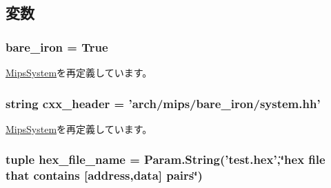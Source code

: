 \subsection{変数}
\hypertarget{classMipsSystem_1_1BareIronMipsSystem_a600ac10fe4fa7eb6168fcdf31a513b95}{
\subsubsection[{bare\_\-iron}]{\setlength{\rightskip}{0pt plus 5cm}bare\_\-iron = True}}
\label{classMipsSystem_1_1BareIronMipsSystem_a600ac10fe4fa7eb6168fcdf31a513b95}


\hyperlink{classMipsSystem_1_1MipsSystem_a6e15ba3272e38d8deffaf29ebfd4bf58}{MipsSystem}を再定義しています。\hypertarget{classMipsSystem_1_1BareIronMipsSystem_a17da7064bc5c518791f0c891eff05fda}{
\subsubsection[{cxx\_\-header}]{\setlength{\rightskip}{0pt plus 5cm}string cxx\_\-header = 'arch/mips/bare\_\-iron/system.hh'}}
\label{classMipsSystem_1_1BareIronMipsSystem_a17da7064bc5c518791f0c891eff05fda}


\hyperlink{classMipsSystem_1_1MipsSystem_a17da7064bc5c518791f0c891eff05fda}{MipsSystem}を再定義しています。\hypertarget{classMipsSystem_1_1BareIronMipsSystem_a646616e47eba70e20cb5c35443d7bf4a}{
\subsubsection[{hex\_\-file\_\-name}]{\setlength{\rightskip}{0pt plus 5cm}tuple hex\_\-file\_\-name = Param.String('test.hex',\char`\"{}hex file that contains \mbox{[}address,data\mbox{]} pairs\char`\"{})}}
\label{classMipsSystem_1_1BareIronMipsSystem_a646616e47eba70e20cb5c35443d7bf4a}


